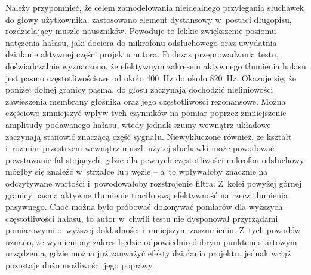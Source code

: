 Należy przypomnieć, że celem zamodelowania nieidealnego przylegania słuchawek do głowy użytkownika, zastosowano element dystansowy w~postaci długopisu, rozdzielający muszle nauszników. Powoduje to lekkie zwiększenie poziomu natężenia hałasu, jaki dociera do mikrofonu odsłuchowego oraz uwydatnia działanie aktywnej części projektu autora. 
Podczas przeprowadzania testu, doświadczalnie wyznaczono, że efektywnym zakresem aktywnego tłumienia hałasu jest pasmo częstotliwościowe od około \SI{400}{\Hz} do około \SI{820}{\Hz}. Okazuje się, że poniżej dolnej granicy pasma, do głosu zaczynają dochodzić nieliniowości zawieszenia membrany głośnika oraz jego częstotliwości rezonansowe. Można częściowo zmniejszyć wpływ tych czynników na pomiar poprzez zmniejszenie amplitudy podawanego hałasu, wtedy jednak szumy wewnątrz-układowe zaczynają stanowić znaczącą część sygnału. Niewykluczone również, że kształt i~rozmiar przestrzeni wewnątrz muszli użytej słuchawki może powodować powstawanie fal stojących, gdzie dla pewnych częstotliwości mikrofon odsłuchowy mógłby się znaleźć w~strzałce lub węźle --  a~to wpływałoby znacznie na odczytywane wartości i~powodowałoby rozstrojenie filtra. Z~kolei powyżej górnej granicy pasma aktywne tłumienie traciło swą efektywność na rzecz tłumienia pasywnego. Choć można było próbować dokonywać pomiarów dla wyższych częstotliwości hałasu, to autor w~chwili testu nie dysponował przyrządami pomiarowymi o~wyższej dokładności i~mniejszym zaszumieniu. Z~tych powodów uznano, że wymieniony zakres będzie odpowiednio dobrym punktem startowym urządzenia, gdzie można już zauważyć efekty działania projektu, jednak wciąż pozostaje dużo możliwości jego poprawy.

